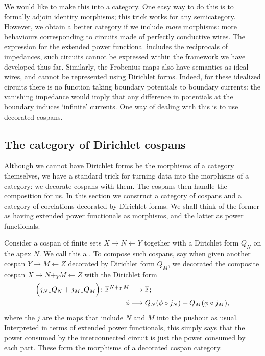 We would like to make this into a category. One easy way to do this is to
formally adjoin identity morphisms; this trick works for any semicategory.
However, we obtain a better category if we include \emph{more} morphisms: more
behaviours corresponding to circuits made of perfectly conductive wires.
The expression for the extended power functional includes the reciprocals of
impedances, such circuits cannot be expressed within the framework we have
developed thus far. Similarly, the Frobenius maps also have semantics as ideal
wires, and cannot be represented using Dirichlet forms.  Indeed, for these
idealized circuits there is no function taking boundary potentials to boundary
currents: the vanishing impedance would imply that any difference in potentials
at the boundary induces `infinite' currents. One way of dealing with this is to
use decorated cospans.


\subsection{The category of Dirichlet cospans} \label{ssec.dirichcospans}

Although we cannot have Dirichlet forms be the morphisms of a category
themselves, we have a standard trick for turning data into the morphisms of a
category: we decorate cospans with them. The cospans then handle the composition
for us. In this section we construct a category of cospans and a category of
corelations decorated by Dirichlet forms. We shall think of the former as having
extended power functionals as morphisms, and the latter as power functionals.

Consider a cospan of finite sets $X \to N \leftarrow Y$ together with a
Dirichlet form $Q_N$ on the apex $N$. We call this a .
To compose such cospans, say when given another cospan $Y \to M \leftarrow Z$
decorated by Dirichlet form $Q_M$, we decorated the composite cospan $X \to
N+_YM \leftarrow Z$ with the Dirichlet form
\begin{align*}
  \Big({j_N}_\ast Q_N+ {j_M}_\ast Q_M\Big){\colon} {\mathbb F}^{N+_YM} &\longrightarrow {\mathbb F};\\
  \phi &\longmapsto Q_N(\phi\circ j_N)+Q_M(\phi\circ j_M),
\end{align*}
where the $j$ are the maps that include $N$ and $M$ into the pushout as usual.
Interpreted in terms of extended power functionals, this simply says that the
power consumed by the interconnected circuit is just the power consumed by each
part. These form the morphisms of a decorated cospan category.

